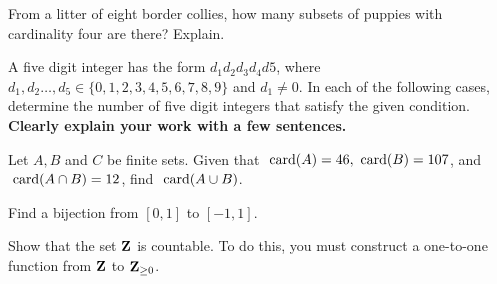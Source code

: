\documentclass[12pt,fleqn]{exam}
\begin{document}
\begin{questions}

\question From a litter of eight border collies, how many subsets of puppies with cardinality four are there?  Explain.

 \question A five digit integer has the form $d_1 d_2 d_3 d_4 d5$,
    where $d_1, d_2 \dots, d_5 \in \{0,1,2,3,4,5,6,7,8,9\}$ and $d_1 \neq 0$.  
      In each of the following cases, determine the number of five digit integers 
    that satisfy the given condition. 
    \textbf{Clearly explain your work with a few sentences.}


\question [10] Let $A,B$ and $C$ be finite sets. Given that $\ \mathrm{card}(A) = 46, \ \mathrm{card}(B) = 107$, and $\ \mathrm{card}(A \cap B) = 12$, find
$\ \mathrm{card}(A \cup B)$.
\begin{solution}%
\end{solution}

\newpage

\question [10] Find a bijection from $[0,1]$  to $[-1,1]$.
\begin{solution}%
\end{solution}

\newpage

\question [10] Show that the set $\mathbf{Z}$ is countable. To do this, you must construct a one-to-one function from $\mathbf{Z}$ to $\mathbf{Z}_{\geq 0}$.

\begin{solution}%
\end{solution}


\end{questions}
\end{document}
